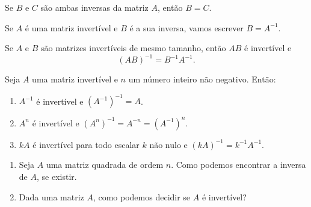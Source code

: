 \documentclass{beamer}
\begin{document}
    \begin{frame}
        \begin{teorema}
            Se $B$ e $C$ são ambas inversas da matriz $A$, então $B = C$.
        \end{teorema}

        \vspace{1cm}

        \begin{notacao}
            Se $A$ é uma matriz invertível e $B$ é a sua inversa, vamos escrever $B = A^{-1}$.
        \end{notacao}
    \end{frame}

    \begin{frame}
        \begin{proposicao}
            Se $A$ e $B$ são matrizes invertíveis de mesmo tamanho, então $AB$ é invertível e
            \[
                (AB)^{-1} = B^{-1}A^{-1}.
            \]
        \end{proposicao}
    \end{frame}

    \begin{frame}
        \begin{proposicao}
            Seja $A$ uma matriz invertível e $n$ um número inteiro não negativo. Então:
            \begin{enumerate}[label={\roman*})]
                \item $A^{-1}$ é invertível e $(A^{-1})^{-1} = A$.

                \item $A^n$ é invertível e $(A^n)^{-1} = A^{-n} = (A^{-1})^n$.

                \item $kA$ é invertível para todo escalar $k$ não nulo e $(kA)^{-1} = k^{-1}A^{-1}$.
            \end{enumerate}
        \end{proposicao}
    \end{frame}

    \begin{frame}
        \begin{enumerate}[label={\arabic*})]
            \item Seja $A$ uma matriz quadrada de ordem $n$. Como podemos encontrar a inversa de $A$, se existir.

            \vspace{1cm}

            \item Dada uma matriz $A$, como podemos decidir se $A$ é invertível?
        \end{enumerate}
    \end{frame}
\end{document}
